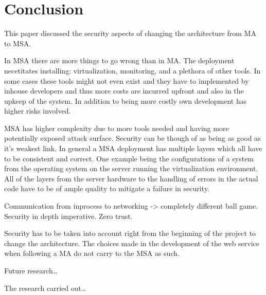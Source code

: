 
\section{Conclusion}
\begin{sloppypar}
    This paper discussed the security aspects of changing the architecture from MA to MSA.
\end{sloppypar}
\begin{sloppypar}
    In MSA there are more things to go wrong than in MA. The deployment 
    necetitates installing: virtualization, monitoring, and a plethora of other
    tools. In some cases these tools might not even exist and they have to 
    implemented by inhouse developers and thus more costs are incurred upfront 
    and also in the upkeep of the system. In addition to being more costly own 
    development has higher risks involved.
\end{sloppypar}
\begin{sloppypar}
    MSA has higher complexity due to more tools needed and having more potentially 
    exposed attack surface. Security can be though of as being as good as it's 
    weakest link. In general a MSA deployment has multiple layers which all 
    have to be consistent and correct. One example being the configurations of 
    a system from the operating system on the server running the virtualization 
    environment. All of the layers from the server hardware to the handling of 
    errors in the actual code have to be of ample quality to mitigate a failure in 
    security.
\end{sloppypar}
\begin{sloppypar}
    Communication from inprocess to networking -> completely different ball game.
    Security in depth imperative. Zero trust.
\end{sloppypar}
\begin{sloppypar}
    Security has to be taken into account right from the beginning of the 
    project to change the architecture. The choices made in the development of 
    the web service when following a MA do not carry to the MSA as such.
\end{sloppypar}
\begin{sloppypar}
    Future research\dots
\end{sloppypar}
\begin{sloppypar}
    The research carried out\dots
\end{sloppypar}

